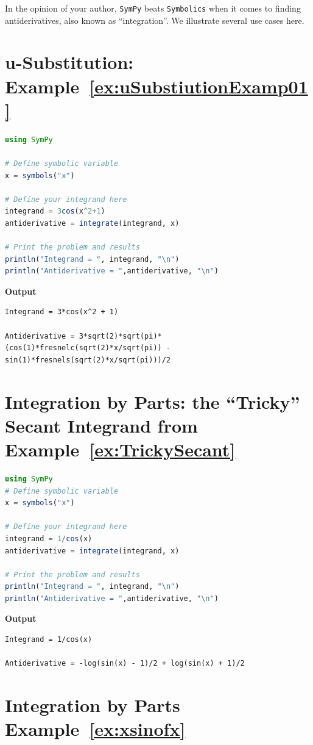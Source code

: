 In the opinion of your author, \texttt{SymPy} beats \texttt{Symbolics} when it comes to finding antiderivatives, also known as ``integration''. We illustrate several use cases here.\\

\section*{u-Substitution: Example~\ref{ex:uSubstiutionExamp01}}

\begin{lstlisting}[language=Julia,style=mystyle]
using SymPy

# Define symbolic variable
x = symbols("x")

# Define your integrand here
integrand = 3cos(x^2+1)
antiderivative = integrate(integrand, x)

# Print the problem and results
println("Integrand = ", integrand, "\n")
println("Antiderivative = ",antiderivative, "\n")
\end{lstlisting}
\textbf{Output} 
\begin{verbatim}
Integrand = 3*cos(x^2 + 1)

Antiderivative = 3*sqrt(2)*sqrt(pi)*(cos(1)*fresnelc(sqrt(2)*x/sqrt(pi)) - sin(1)*fresnels(sqrt(2)*x/sqrt(pi)))/2
\end{verbatim}

\section*{Integration by Parts: the ``Tricky'' Secant Integrand from Example~\ref{ex:TrickySecant}}

\begin{lstlisting}[language=Julia,style=mystyle]
using SymPy
# Define symbolic variable
x = symbols("x")

# Define your integrand here
integrand = 1/cos(x)
antiderivative = integrate(integrand, x)

# Print the problem and results
println("Integrand = ", integrand, "\n")
println("Antiderivative = ",antiderivative, "\n")
\end{lstlisting}
\textbf{Output} 
\begin{verbatim}
Integrand = 1/cos(x)

Antiderivative = -log(sin(x) - 1)/2 + log(sin(x) + 1)/2
\end{verbatim}

\section*{Integration by Parts Example~\ref{ex:xsinofx}}


